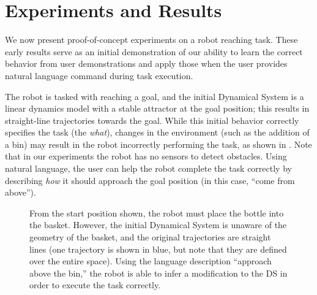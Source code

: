 \section{Experiments and Results}
\label{sec:results}

We now present proof-of-concept experiments on a robot reaching task.
These early results serve as an initial demonstration of our ability to learn the correct behavior from user demonstrations and apply those when the user provides natural language command during task execution.

The robot is tasked with reaching a goal, and the initial Dynamical System is a linear dynamics model with a stable attractor at the goal position; this results in straight-line trajectories towards the goal.
While this initial behavior correctly specifies the task (the \emph{what}), changes in the environment (such as the addition of a bin) may result in the robot incorrectly performing the task, as shown in . Note that in our experiments the robot has no sensors to detect obstacles.
Using natural language, the user can help the robot complete the task correctly by describing \emph{how} it should approach the goal position (in this case, ``come from above'').


\begin{figure}[t]
  \centering
  \caption{
    From the start position shown, the robot must place the bottle into the basket.
    However, the initial Dynamical System is unaware of the geometry of the basket, and the original trajectories are straight lines (one trajectory is shown in blue, but note that they are defined over the entire space).
    Using the language description ``approach above the bin,'' the robot is able to infer a modification to the DS in order to execute the task correctly.
  }
  \label{figExperimentSetup}
\end{figure}
